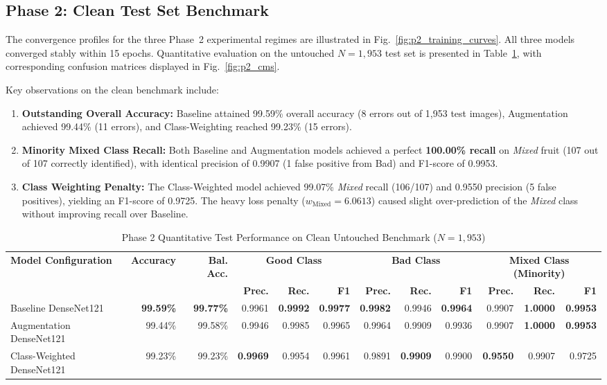 \documentclass[conference]{IEEEtran}
\begin{document}
\subsection{Phase 2: Clean Test Set Benchmark}
The convergence profiles for the three Phase~2 experimental regimes are illustrated in Fig.~\ref{fig:p2_training_curves}. All three models converged stably within 15 epochs. Quantitative evaluation on the untouched $N=1,953$ test set is presented in Table~\ref{tab:phase2_results}, with corresponding confusion matrices displayed in Fig.~\ref{fig:p2_cms}.

Key observations on the clean benchmark include:
\begin{enumerate}
    \item \textbf{Outstanding Overall Accuracy:} Baseline attained 99.59\% overall accuracy (8 errors out of 1,953 test images), Augmentation achieved 99.44\% (11 errors), and Class-Weighting reached 99.23\% (15 errors).
    \item \textbf{Minority Mixed Class Recall:} Both Baseline and Augmentation models achieved a perfect \textbf{100.00\% recall} on \textit{Mixed} fruit (107 out of 107 correctly identified), with identical precision of 0.9907 (1 false positive from Bad) and F1-score of 0.9953.
    \item \textbf{Class Weighting Penalty:} The Class-Weighted model achieved 99.07\% \textit{Mixed} recall (106/107) and 0.9550 precision (5 false positives), yielding an F1-score of 0.9725. The heavy loss penalty ($w_{\text{Mixed}}=6.0613$) caused slight over-prediction of the \textit{Mixed} class without improving recall over Baseline.
\end{enumerate}

\begin{table}[!t]
\caption{Phase 2 Quantitative Test Performance on Clean Untouched Benchmark ($N=1,953$)}
\label{tab:phase2_results}
\centering
\begin{tabular}{lrrrrrrrrrrr}
\toprule
\multirow{2}{*}{\textbf{Model Configuration}} & \multirow{2}{*}{\textbf{Accuracy}} & \multirow{2}{*}{\textbf{Bal. Acc.}} & \multicolumn{3}{c}{\textbf{Good Class}} & \multicolumn{3}{c}{\textbf{Bad Class}} & \multicolumn{3}{c}{\textbf{Mixed Class (Minority)}} \\
\cmidrule(lr){4-6} \cmidrule(lr){7-9} \cmidrule(lr){10-12}
& & & \textbf{Prec.} & \textbf{Rec.} & \textbf{F1} & \textbf{Prec.} & \textbf{Rec.} & \textbf{F1} & \textbf{Prec.} & \textbf{Rec.} & \textbf{F1} \\
\midrule
Baseline DenseNet121 & \textbf{99.59\%} & \textbf{99.77\%} & 0.9961 & \textbf{0.9992} & \textbf{0.9977} & \textbf{0.9982} & 0.9946 & \textbf{0.9964} & 0.9907 & \textbf{1.0000} & \textbf{0.9953} \\
Augmentation DenseNet121 & 99.44\% & 99.58\% & 0.9946 & 0.9985 & 0.9965 & 0.9964 & 0.9909 & 0.9936 & 0.9907 & \textbf{1.0000} & \textbf{0.9953} \\
Class-Weighted DenseNet121 & 99.23\% & 99.23\% & \textbf{0.9969} & 0.9954 & 0.9961 & 0.9891 & \textbf{0.9909} & 0.9900 & \textbf{0.9550} & 0.9907 & 0.9725 \\
\bottomrule
\end{tabular}
\end{table}
\end{document}
